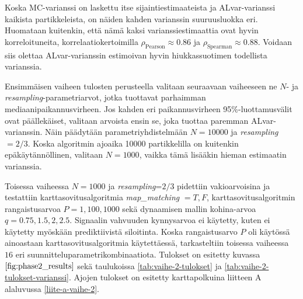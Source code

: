 \documentclass[
  12pt,
  a4paper, twoside]{book}
\begin{document}
Koska MC-varianssi on laskettu itse sijaintiestimaateista ja ALvar-varianssi kaikista partikkeleista, on näiden kahden varianssin suuruusluokka eri. Huomataan kuitenkin, että nämä kaksi varianssiestimaattia ovat hyvin korreloituneita, korrelaatiokertoimilla \(\rho_\text{Pearson} \approx 0.86\) ja \(\rho_\text{Spearman} \approx 0.88\). Voidaan siis olettaa ALvar-varianssin estimoivan hyvin hiukkassuotimen todellista varianssia.

Ensimmäisen vaiheen tulosten perusteella valitaan seuraavaan vaiheeseen ne \(N\)- ja \emph{resampling}-parametriarvot, jotka tuottavat parhaimman mediaanipaikannusvirheen. Jos kahden eri paikannusvirheen 95\%-luottamusvälit ovat päällekäiset, valitaan arvoista ensin se, joka tuottaa paremman ALvar-varianssin. Näin päädytään parametriyhdistelmään \(N=10000\) ja \emph{resampling} \(=2/3\). Koska algoritmin ajoaika 10000 partikkelilla on kuitenkin epäkäytännöllinen, valitaan \(N=1000\), vaikka tämä lisääkin hieman estimaatin varianssia.

Toisessa vaiheessa \(N=1000\) ja \emph{resampling}=\(2/3\) pidettiin vakioarvoisina ja testattiin karttasovitusalgoritmia \emph{map\_matching} \(={T,F}\), karttasovitusalgoritmin rangaistusarvoa \(P={1,100,1000}\) sekä dynaamisen mallin kohina-arvoa \(q={0.75,1.5,2,2.5}\). Signaalin vahvuuden kynnysarvoa ei käytetty, kuten ei käytetty myöskään prediktiivistä siloitinta. Koska rangaistusarvo \(P\) oli käytössä ainoastaan karttasovitusalgoritmia käytettäessä, tarkasteltiin toisessa vaiheessa \(16\) eri suunnitteluparametrikombinaatiota. Tulokset on esitetty kuvassa \(\ref{fig:phase2_results}\) sekä taulukoissa \ref{tab:vaihe-2-tulokset} ja \ref{tab:vaihe-2-tulokset-varianssi}. Ajojen tulokset on esitetty karttapolkuina liitteen A alaluvussa \ref{liite-a-vaihe-2}.
\end{document}
